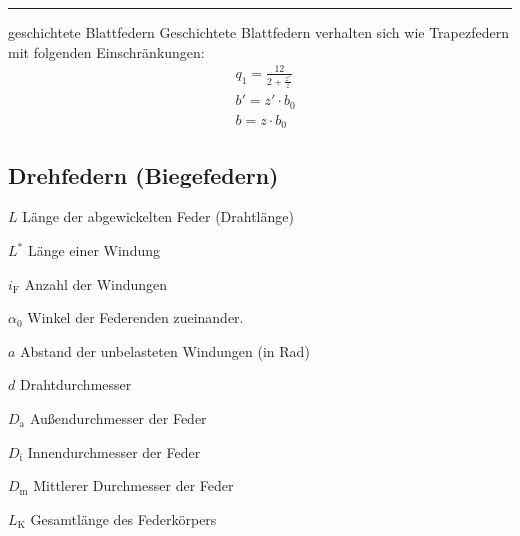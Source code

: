 \hrule
\begin{eeqn}{geschichtete Blattfedern}
	Geschichtete Blattfedern verhalten sich wie Trapezfedern mit folgenden Einschränkungen:
	\begin{align}
		&q_1  = \frac{12}{2+\frac{z'}{z}}\\
		&b' = z'\cdot b_0 \\
		&b  = z \cdot b_0
	\end{align}
\end{eeqn}

\subsection{Drehfedern (Biegefedern)}
\begin{vardef}
	\item[$L$] Länge der abgewickelten Feder (Drahtlänge)
	\item[$L^*$] Länge einer Windung
	\item[$i_\text{F}$] Anzahl der Windungen
	\item[$\alpha_0$] Winkel der Federenden zueinander.
	\item[$a$] Abstand der unbelasteten Windungen (in Rad)
	\item[$d$] Drahtdurchmesser
	\item[$D_\text{a}$] Außendurchmesser der Feder
	\item[$D_\text{i}$] Innendurchmesser der Feder
	\item[$D_\text{m}$] Mittlerer  Durchmesser der Feder
	\item[$L_\text{K}$] Gesamtlänge des Federkörpers
\end{vardef}
